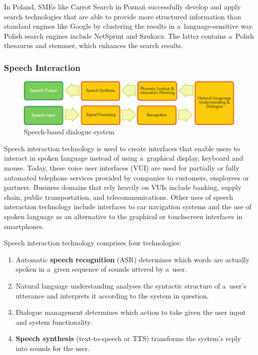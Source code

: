 \begin{multicols}{2}
In Poland, SMEs like Carrot Search in Poznań successfully develop and
apply search technologies that are able to provide more structured
information than standard engines like Google by clustering the
results in a~language-sensitive way. Polish search engines include
NetSprint and Szukacz. The latter contains a~Polish thesaurus and
stemmer, which enhances the search results. 

\subsubsection{Speech Interaction} 

\begin{figure}[t]  \center
\includegraphics[width=\textwidth]{../_media/english/simple_speech-based_dialogue_architecture}
\caption{Speech-based dialogue system} \label{fig:dialoguearch_en}
 \end{figure} 

Speech interaction technology is used to create interfaces that enable
users to interact in spoken language instead of using a~graphical
display, keyboard and mouse. Today, these voice user interfaces (VUI)
are used for partially or fully automated telephone services provided
by companies to customers, employees or partners. Business domains
that rely heavily on VUIs include banking, supply chain, public
transportation, and telecommunications. Other uses of speech
interaction technology include interfaces to car navigation systems
and the use of spoken language as an alternative to the graphical or
touchscreen interfaces in smartphones. 

Speech interaction technology comprises four technologies: 

\begin{enumerate} \item Automatic \textbf{speech recognition} (ASR)
determines which words are actually spoken in a~given sequence of
sounds uttered by a~user. \item Natural language understanding
analyses the syntactic structure of a~user’s utterance and
interprets it according to the system in question. \item Dialogue
management determines which action to take given the user input and
system functionality. \item \textbf{Speech synthesis} (text-to-speech
or TTS) transforms the system’s reply into sounds for the user.
\end{enumerate} 


\end{multicols}

